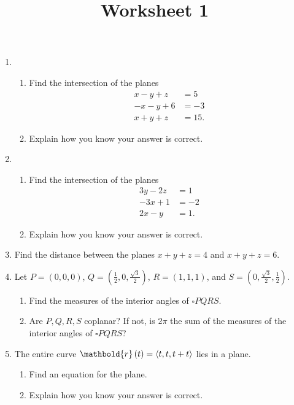 \documentclass[12pt]{article}
\title{Worksheet 1}
\author{}\date{}
\let\sin\relax\DeclareMathOperator{\sin}{\mathsf{sin}}
\let\cos\relax\DeclareMathOperator{\cos}{\mathsf{cos}}
\begin{document}
\maketitle
\thispagestyle{empty}

\begin{enumerate}

\item
\begin{enumerate}
\item Find the intersection of the planes
\begin{align*}
x-y+z&=5\\
-x-y+6&=-3\\
x+y+z&=15.
\end{align*}
\item Explain how you know your answer is correct.
\end{enumerate}

\item
\begin{enumerate}
\item Find the intersection of the planes
\begin{align*}
3y-2z&=1\\
-3x+1&=-2\\
2x-y&=1.
\end{align*}
\item Explain how you know your answer is correct.
\end{enumerate}

\item Find the distance between the planes
$x+y+z=4$ and $x+y+z=6$.

\item Let $P=\left(0,0,0\right)$,
$Q=\left(\frac{1}{2},0,\frac{\sqrt{3}}{2}\right)$,
$R=\left(1,1,1\right)$, and
$S=\left(0,\frac{\sqrt{3}}{2},\frac{1}{2}\right)$.
\begin{enumerate}
\item Find the measures of the interior angles
of $\square PQRS$.
\item Are $P,Q,R,S$ coplanar? If not, is $2\pi$ the
sum of the measures of the interior angles of
$\square PQRS$?
\end{enumerate}

\item
The entire curve $\mathbold{r}\left(t\right)
=\left\langle\cos{t},\sin{t},\cos{t}+\sin{t}\right\rangle$
lies in a plane.
\begin{enumerate}
\item Find an equation for the plane.
\item Explain how you know your answer is correct.
\end{enumerate}
\end{enumerate}
\end{document}

